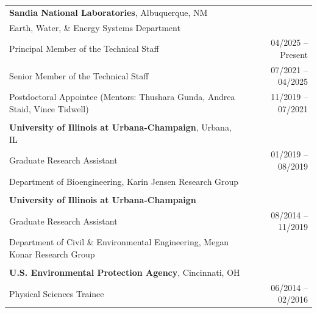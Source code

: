 \documentclass{article}[12pt]
\begin{document}
		\begin{tabularx}{\textwidth}{Xr}
			\multicolumn{2}{l}{\textbf{Sandia National Laboratories}, Albuquerque, NM} \\
			Earth, Water, \& Energy Systems Department & \\
			Principal Member of the Technical Staff & 04/2025 -- Present \\
			Senior Member of the Technical Staff & 07/2021 -- 04/2025 \\
			Postdoctoral Appointee (Mentors: Thushara Gunda, Andrea Staid, Vince Tidwell) & 11/2019 -- 07/2021 \\
			
			\\
			\textbf{University of Illinois at Urbana-Champaign}, Urbana, IL & \\
			Graduate Research Assistant & 01/2019 -- 08/2019 \\
			Department of Bioengineering, Karin Jensen Research Group & \\
			\\
			\textbf{University of Illinois at Urbana-Champaign} \\%
			Graduate Research Assistant & 08/2014 -- 11/2019 \\
			Department of Civil \& Environmental Engineering, Megan Konar Research Group & \\
			\\
			\textbf{U.S. Environmental Protection Agency}, Cincinnati, OH \\
			Physical Sciences Trainee & 06/2014 -- 02/2016 \\

\end{tabularx}
\end{document}
